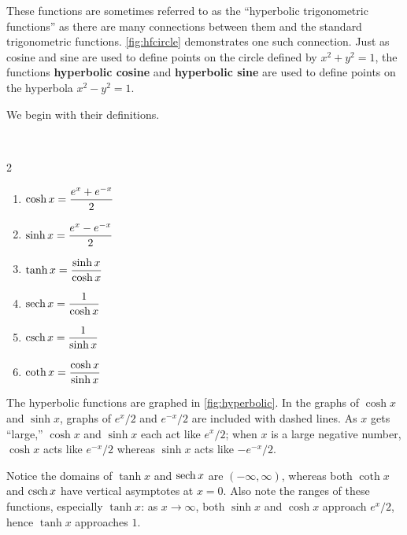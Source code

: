 These functions are sometimes referred to as the ``hyperbolic trigonometric functions'' as there are many connections between them and the standard trigonometric functions. \autoref{fig:hfcircle} demonstrates one such connection. Just as cosine and sine are used to define points on the circle defined by $x^2+y^2=1$, the functions \textbf{hyperbolic cosine} and \textbf{hyperbolic sine} are used to define points on the hyperbola $x^2-y^2=1$.

We begin with their definitions.

\begin{definition}\label{def:hyperbolic_functions}%
\mbox{}\\[-2\baselineskip]\parbox[t]{\linewidth}{%
\begin{multicols}{2}%
\begin{enumerate}
\item		$\displaystyle \cosh x = \frac{e^x+e^{-x}}2$
\item		$\displaystyle \sinh x = \frac{e^x-e^{-x}}2$
\item		$\displaystyle \tanh x = \frac{\sinh x}{\cosh x}$
\item		$\displaystyle \operatorname{sech} x = \frac{1}{\cosh x}$
\item		$\displaystyle \operatorname{csch} x = \frac{1}{\sinh x}$
\item		$\displaystyle \coth x = \frac{\cosh x}{\sinh x}$
\end{enumerate}
\end{multicols}}
\end{definition}

The hyperbolic functions are graphed in \autoref{fig:hyperbolic}. In the graphs of $\cosh x$ and $\sinh x$, graphs of $e^x/2$ and $e^{-x}/2$ are included with dashed lines. As $x$ gets ``large,'' $\cosh x$ and $\sinh x$ each act like $e^x/2$; when $x$ is a large negative number, $\cosh x$ acts like $e^{-x}/2$ whereas $\sinh x$ acts like $-e^{-x}/2$.


Notice the domains of $\tanh x$ and $\operatorname{sech} x$ are $(-\infty,\infty)$, whereas both $\coth x$ and $\operatorname{csch} x$ have vertical asymptotes at $x=0$. Also note the ranges of these functions, especially $\tanh x$: as $x\to\infty$, both $\sinh x$ and $\cosh x$ approach $e^x/2$, hence $\tanh x$ approaches $1$.

